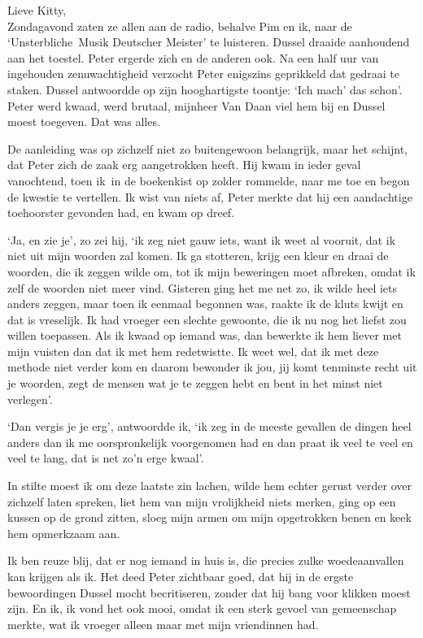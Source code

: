 \documentclass{book}
\begin{document}
Lieve Kitty,\\
Zondagavond zaten ze allen aan de radio, behalve Pim en ik, naar
de `Unsterbliche~Musik Deutscher Meister' te luisteren. Dussel draaide
aanhoudend aan het toestel. Peter ergerde zich en de anderen ook. Na een half
uur van ingehouden zenuwachtigheid verzocht Peter enigszins geprikkeld dat
gedraai te staken. Dussel antwoordde op zijn hooghartigste toontje: `Ich mach'
das schon'. Peter werd kwaad, werd brutaal, mijnheer Van Daan viel hem bij en
Dussel moest toegeven. Dat was alles.

De aanleiding was op zichzelf niet zo buitengewoon belangrijk, maar het schijnt,
dat Peter zich de zaak erg aangetrokken heeft. Hij kwam in ieder geval
vanochtend, toen ik~in de boekenkist op zolder rommelde, naar me toe en begon de
kwestie te vertellen. Ik wist van niets af, Peter merkte dat hij een aandachtige
toehoorster gevonden had, en kwam op dreef.

`Ja, en zie je', zo zei hij, `ik zeg niet gauw iets, want ik weet al vooruit,
dat ik niet uit mijn woorden zal komen. Ik ga stotteren, krijg een kleur en
draai de woorden, die ik zeggen wilde om, tot ik mijn beweringen moet afbreken,
omdat ik zelf de woorden niet meer vind.  Gisteren ging het me net zo, ik wilde
heel iets anders zeggen, maar toen ik eenmaal begonnen was, raakte ik de kluts
kwijt en dat is vreselijk.  Ik had vroeger een slechte gewoonte, die ik nu nog
het liefst zou willen toepassen. Als ik kwaad op iemand was, dan bewerkte ik hem
liever met mijn vuisten dan dat ik met hem redetwistte. Ik weet wel, dat ik met
deze methode niet verder kom en daarom bewonder ik jou, jij komt tenminste recht
uit je woorden, zegt de mensen wat je te zeggen hebt en bent in het minst niet
verlegen'.

`Dan vergis je je erg', antwoordde ik, `ik zeg in de meeste gevallen de dingen
heel anders dan ik me oorspronkelijk voorgenomen had en dan praat ik veel te
veel en veel te lang, dat is net zo'n erge kwaal'.

In stilte moest ik om deze laatste zin lachen, wilde hem echter gerust verder
over zichzelf laten spreken, liet hem van mijn vrolijkheid niets merken, ging op
een kussen op de grond zitten, sloeg mijn armen om mijn opgetrokken benen en
keek hem opmerkzaam aan.

Ik ben reuze blij, dat er nog iemand in huis is, die precies zulke
woedeaanvallen kan krijgen als ik. Het deed Peter zichtbaar goed, dat hij in de
ergste bewoordingen Dussel mocht becritiseren, zonder dat hij bang voor klikken
moest zijn. En ik, ik vond het ook mooi, omdat ik een sterk gevoel van
gemeenschap merkte, wat ik vroeger alleen maar met mijn vriendinnen had.
\end{document}
